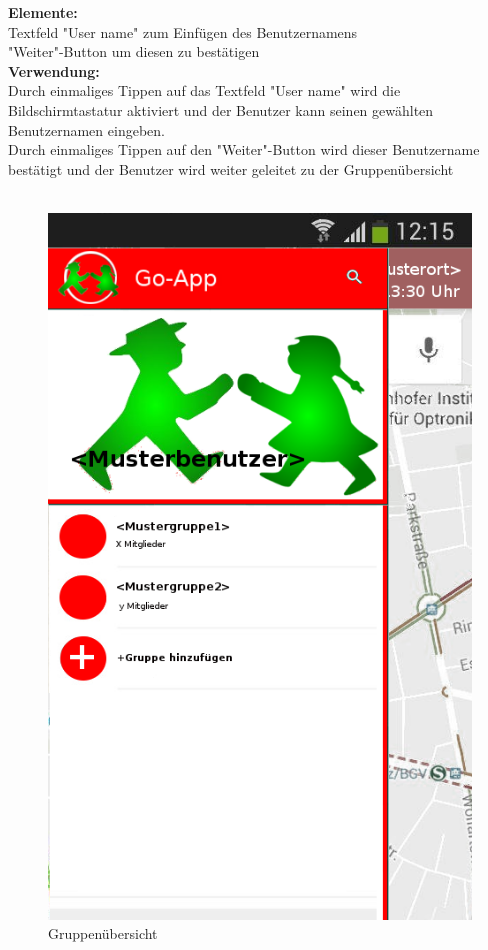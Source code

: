 \textbf{Elemente:}\\
Textfeld "User name" zum Einfügen des Benutzernamens\\
"Weiter"-Button um diesen zu bestätigen\\
\textbf{Verwendung:}\\
Durch einmaliges Tippen auf das Textfeld "User name" wird die Bildschirmtastatur aktiviert und der Benutzer kann seinen gewählten Benutzernamen eingeben.\\
Durch einmaliges Tippen auf den "Weiter"-Button wird dieser Benutzername bestätigt und der Benutzer wird weiter geleitet zu der Gruppenübersicht\\ \\

\begin{figure} [H]
	\caption{Gruppenübersicht}
	\includegraphics[scale = 0.5]{resources/images/gruppenuebersicht.png}
\end{figure}

